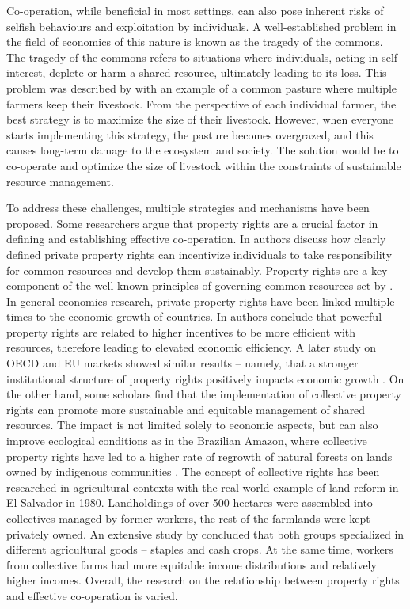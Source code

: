 \documentclass[pdflatex,sn-basic,lineno]{sn-jnl}
\theoremstyle{thmstyleone}%
\theoremstyle{thmstyletwo}%
\theoremstyle{thmstylethree}%
\begin{document}
Co-operation, while beneficial in most settings, can also pose inherent risks of selfish behaviours and exploitation by
individuals. A well-established problem in the field of economics of this nature is known as the tragedy of the commons.
The tragedy of the commons refers to situations where individuals, acting in self-interest, deplete or harm a shared
resource, ultimately leading to its loss. This problem was described by \cite{hardin1968tragedy} with an example of a
common pasture where multiple farmers keep their livestock. From the perspective of each individual farmer, the best
strategy is to maximize the size of their livestock. However, when everyone starts implementing this strategy, the
pasture becomes overgrazed, and this causes long-term damage to the ecosystem and society. The solution would be to
co-operate and optimize the size of livestock within the constraints of sustainable resource management.

To address these challenges, multiple strategies and mechanisms have been proposed. Some researchers argue that property
rights are a crucial factor in defining and establishing effective co-operation. In \cite{anderson2003property} authors
discuss how clearly defined private property rights can incentivize individuals to take responsibility for common
resources and develop them sustainably. Property rights are a key component of the well-known principles of governing
common resources set by \cite{Ostrom1990}. In general economics research, private property rights have been linked
multiple times to the economic growth of countries. In \cite{Jaffe1996} authors conclude that powerful property rights
are related to higher incentives to be more efficient with resources, therefore leading to elevated economic efficiency.
A later study on OECD and EU markets showed similar results – namely, that a stronger institutional structure of
property rights positively impacts economic growth \citep{Haydarolu2015}. On the other hand, some scholars find that the
implementation of collective property rights can promote more sustainable and equitable management of shared resources.
The impact is not limited solely to economic aspects, but can also improve ecological conditions as in the Brazilian
Amazon, where collective property rights have led to a higher rate of regrowth of natural forests on lands owned by
indigenous communities \citep{Baragwanath2023}. The concept of collective rights has been researched in agricultural
contexts with the real-world example of land reform in El Salvador in 1980. Landholdings of over 500 hectares were
assembled into collectives managed by former workers, the rest of the farmlands were kept privately owned. An extensive
study by \cite{montero2022cooperative} concluded that both groups specialized in different agricultural goods – staples
and cash crops. At the same time, workers from collective farms had more equitable income distributions and relatively
higher incomes. Overall, the research on the relationship between property rights and effective co-operation is varied.
\end{document}
